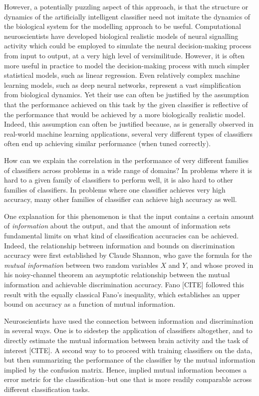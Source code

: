 However, a potentially puzzling aspect of this approach, is that the
structure or dynamics of the artificially intelligent classifier need
not imitate the dynamics of the biological system for the modelling
approach to be useful.  Computational neuroscientists have developed
biological realistic models of neural signalling activity which could
be employed to simulate the neural decision-making process from input
to output, at a very high level of versimilitude.  However, it is
often more useful in practice to model the decision-making process
with much simpler statistical models, such as linear regression.  Even
relatively complex machine learning models, such as deep neural
networks, represent a vast simplification from biological dynamics.
Yet their use can often be justified by the assumption that the
performance achieved on this task by the given classifier is
reflective of the performance that would be achieved by a more
biologically realistic model.  Indeed, this assumption can often be
justified because, as is generally observed in real-world machine
learning applications, several very different types of classifiers
often end up achieving similar performance (when tuned correctly).

How can we explain the correlation in the performance of very
different families of classifiers across problems in a wide range of
domains? In problems where it is hard to a given family of classifiers
to perform well, it is also hard to other families of classifiers.  In
problems where one classifier achieves very high accuracy, many other
families of classifier can achieve high accuracy as well.  

One explanation for this phenomenon is that the input contains a
certain amount of \emph{information} about the output, and that the
amount of information sets fundamental limits on what kind of
classification accuracies can be achieved.  Indeed, the relationship
between information and bounds on discrimination accuracy were first
established by Claude Shannon, who gave the formula for the
\emph{mutual information} between two random variables $X$ and $Y$,
and whose proved in his noisy-channel theorem an asymptotic
relationship between the mutual information and achievable
discrimination accuracy.  Fano [CITE] followed this result with the
equally classical Fano's inequality, which establishes an upper bound
on accuracy as a function of mutual information.

Neuroscientists have used the connection between information and
discrimination in several ways.  One is to sidestep the application of
classifiers altogether, and to directly estimate the mutual
information between brain activity and the task of interest [CITE].  A
second way to to proceed with training classifiers on the data, but
then summarizing the performance of the classifier by the mutual
information implied by the confusion matrix.  Hence, implied mutual
information becomes a error metric for the classification--but one
that is more readily comparable across different classification tasks.


